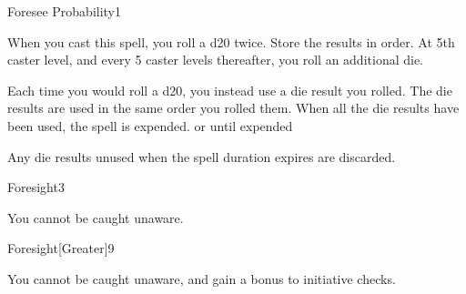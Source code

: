 \begin{spellsection}{Foresee Probability}{1}
\begin{spellheader}
\end{spellheader}
\begin{spellcontent}
    \begin{spelltargetinginfo}
    \end{spelltargetinginfo}
    \begin{spelleffects}
        \spelleffect When you cast this spell, you roll a d20 twice. Store the results in order. At 5th caster level, and every 5 caster levels thereafter, you roll an additional die.

        Each time you would roll a d20, you instead use a die result you rolled. The die results are used in the same order you rolled them. When all the die results have been used, the spell is expended.
        \spelldur \durshort or until expended
    \end{spelleffects}
\end{spellcontent}
\begin{spellfooter}
    \spellnotes Any die results unused when the spell duration expires are discarded.
\end{spellfooter}
\end{spellsection}

\begin{spellsection}{Foresight}{3}
\begin{spellheader}
\end{spellheader}
\begin{spellcontent}
    \begin{spelleffects}
        \spelleffect You cannot be caught unaware.
        \spelldur \durext
    \end{spelleffects}
\end{spellcontent}
\begin{spellfooter}
\end{spellfooter}
\end{spellsection}

\begin{spellsection}{Foresight}[Greater]{9}
\begin{spellheader}
\end{spellheader}
\begin{spellcontent}
    \begin{spelleffects}
        \spelleffect You cannot be caught unaware, and gain a  bonus to initiative checks.
        \spelldur \durext
    \end{spelleffects}
\end{spellcontent}
\begin{spellfooter}
\end{spellfooter}
\end{spellsection}

